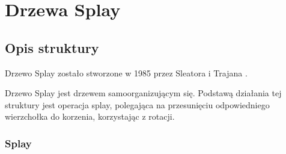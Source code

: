 \documentclass[declaration,shortabstract]{iithesis}
\theoremstyle{thm}
\theoremstyle{remark}
\theoremstyle{plain}
\theoremstyle{plain}
\theoremstyle{plain}
\begin{document}
\chapter{Drzewa Splay}   

\section{Opis struktury}  

Drzewo Splay zostało stworzone w 1985 przez Sleatora i Trajana \cite{DBLP:journals/jacm/SleatorT85}.

Drzewo Splay jest drzewem samoorganizującym się. Podstawą działania tej struktury jest operacja splay, polegająca na przesunięciu odpowiedniego wierzchołka do korzenia, korzystając z rotacji.   

\subsection{Splay}  
\end{document}
